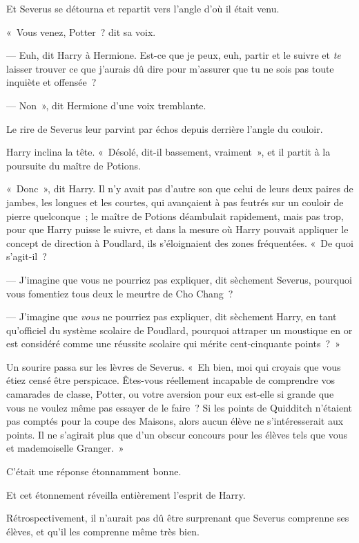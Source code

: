 Et Severus se détourna et repartit vers l'angle d'où il était venu.

«~Vous venez, Potter~? dit sa voix.

--- Euh, dit Harry à Hermione.
Est-ce que je peux, euh, partir et le suivre et \emph{te} laisser trouver ce que j'aurais dû dire pour m'assurer que tu ne sois pas toute inquiète et offensée~?

--- Non~», dit Hermione d'une voix tremblante.

Le rire de Severus leur parvint par échos depuis derrière l'angle du couloir.

Harry inclina la tête.
«~Désolé, dit-il bassement, vraiment~», et il partit à la poursuite du maître de Potions.

\later

«~Donc~», dit Harry.
Il n'y avait pas d'autre son que celui de leurs deux paires de jambes, les longues et les courtes, qui avançaient à pas feutrés sur un couloir de pierre quelconque~; le maître de Potions déambulait rapidement, mais pas trop, pour que Harry puisse le suivre, et dans la mesure où Harry pouvait appliquer le concept de direction à Poudlard, ils s'éloignaient des zones fréquentées.
«~De quoi s'agit-il~?

--- J'imagine que vous ne pourriez pas expliquer, dit sèchement Severus, pourquoi vous fomentiez tous deux le meurtre de Cho Chang~?

--- J'imagine que \emph{vous} ne pourriez pas expliquer, dit sèchement Harry, en tant qu'officiel du système scolaire de Poudlard, pourquoi attraper un moustique en or est considéré comme une réussite scolaire qui mérite cent-cinquante points~?~»

Un sourire passa sur les lèvres de Severus.
«~Eh bien, moi qui croyais que vous étiez censé être perspicace.
Êtes-vous réellement incapable de comprendre vos camarades de classe, Potter, ou votre aversion pour eux est-elle si grande que vous ne voulez même pas essayer de le faire~?
Si les points de Quidditch n'étaient pas comptés pour la coupe des Maisons, alors aucun élève ne s'intéresserait aux points.
Il ne s'agirait plus que d'un obscur concours pour les élèves tels que vous et mademoiselle Granger.~»

C'était une réponse étonnamment bonne.

Et cet étonnement réveilla entièrement l'esprit de Harry.

Rétrospectivement, il n'aurait pas dû être surprenant que Severus comprenne ses élèves, et qu'il les comprenne même très bien.

